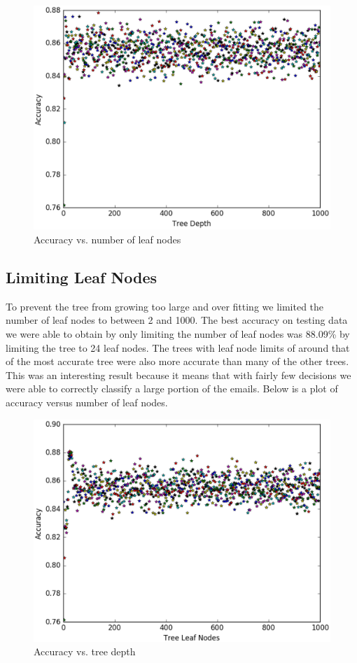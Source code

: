 \documentclass[10pt,letterpaper,onecolumn,draftclsnofoot]{IEEEtran}
\begin{document}
\begin{figure}[H]
\includegraphics[scale=.75]{accuracy-vs-depth}
\caption{Accuracy vs. number of leaf nodes}
\end{figure}

\subsection{Limiting Leaf Nodes}
To prevent the tree from growing too large and over fitting we limited the number of leaf nodes to between 2 and 1000. The best accuracy on testing data we were able to obtain by only limiting the number of leaf nodes was 88.09\% by limiting the tree to 24 leaf nodes. The trees with leaf node limits of around that of the most accurate tree were also more accurate than many of the other trees. This was an interesting result because it means that with fairly few decisions we were able to correctly classify a large portion of the emails. Below is a plot of accuracy versus number of leaf nodes.
\begin{figure}[H]
\includegraphics[scale=.75]{accuracy-vs-nodes}
\caption{Accuracy vs. tree depth}
\end{figure}
\end{document}
